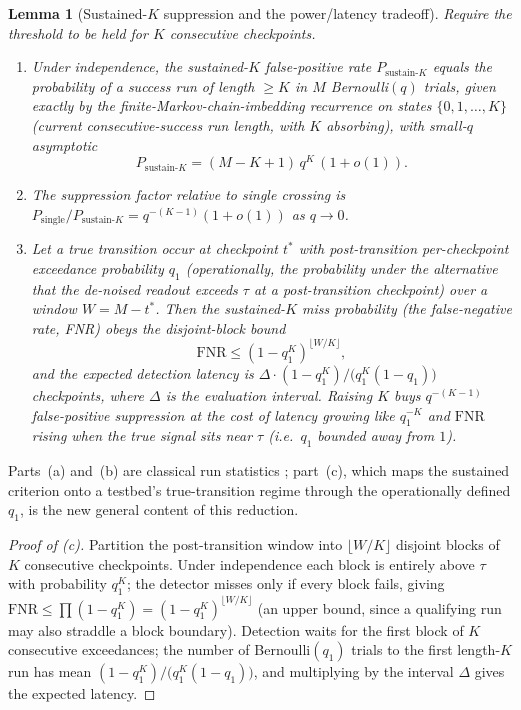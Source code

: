 \documentclass[11pt]{article}
\theoremstyle{plain}
\newtheorem{lemma}{Lemma}
\theoremstyle{definition}
\begin{document}
\begin{lemma}[Sustained-$K$ suppression and the power/latency tradeoff]\label{lem:sustain}
Require the threshold to be held for $K$ consecutive checkpoints.
\begin{enumerate}
\item[\textnormal{(a)}] Under independence, the sustained-$K$ false-positive rate
  $P_{\mathrm{sustain}\text{-}K}$ equals the probability of a success run of length $\geq K$
  in $M$ Bernoulli$(q)$ trials, given exactly by the finite-Markov-chain-imbedding
  recurrence on states $\{0,1,\dots,K\}$ (current consecutive-success run length, with $K$
  absorbing), with small-$q$ asymptotic
  \[
    P_{\mathrm{sustain}\text{-}K} = (M-K+1)\,q^{K}\,(1+o(1)).
  \]
\item[\textnormal{(b)}] The suppression factor relative to single crossing is
  $P_{\mathrm{single}}/P_{\mathrm{sustain}\text{-}K} = q^{-(K-1)}(1+o(1))$ as $q\to0$.
\item[\textnormal{(c)}] Let a true transition occur at checkpoint $t^{\ast}$ with
  post-transition per-checkpoint exceedance probability $q_1$ (operationally, the
  probability under the alternative that the de-noised readout exceeds $\tau$ at a
  post-transition checkpoint) over a window $W=M-t^{\ast}$. Then the sustained-$K$ miss
  probability (the false-negative rate, FNR) obeys the disjoint-block bound
  \[
    \mathrm{FNR}\leq (1-q_1^{K})^{\lfloor W/K\rfloor},
  \]
  and the expected detection latency is
  $\Delta\cdot(1-q_1^{K})/\bigl(q_1^{K}(1-q_1)\bigr)$ checkpoints, where $\Delta$ is the
  evaluation interval. Raising $K$ buys $q^{-(K-1)}$ false-positive suppression at the cost
  of latency growing like $q_1^{-K}$ and $\mathrm{FNR}$ rising when the true signal sits
  near $\tau$ (i.e.\ $q_1$ bounded away from $1$).
\end{enumerate}
\end{lemma}

Parts~(a) and~(b) are classical run statistics
\citep{feller1968,fulou2003runs,glaz2001scan}; part~(c), which maps the sustained criterion
onto a testbed's true-transition regime through the operationally defined $q_1$, is the new
general content of this reduction.

\begin{proof}[Proof of \textnormal{(c)}]
Partition the post-transition window into $\lfloor W/K\rfloor$ disjoint blocks of $K$
consecutive checkpoints. Under independence each block is entirely above $\tau$ with
probability $q_1^{K}$; the detector misses only if every block fails, giving
$\mathrm{FNR}\leq\prod(1-q_1^{K})=(1-q_1^{K})^{\lfloor W/K\rfloor}$ (an upper bound, since a
qualifying run may also straddle a block boundary). Detection waits for the first block of
$K$ consecutive exceedances; the number of Bernoulli$(q_1)$ trials to the first length-$K$
run has mean $(1-q_1^{K})/\bigl(q_1^{K}(1-q_1)\bigr)$, and multiplying by the interval
$\Delta$ gives the expected latency.
\end{proof}
\end{document}
